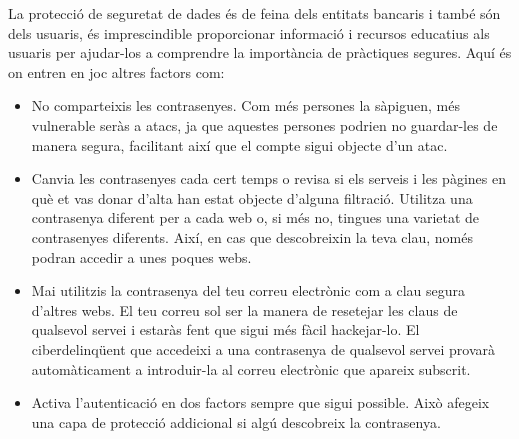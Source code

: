 La protecció de seguretat de dades és de feina dels entitats bancaris i també són dels usuaris, és imprescindible proporcionar informació i recursos educatius als usuaris per ajudar-los a comprendre la importància de pràctiques segures. Aquí és on entren en joc altres factors com:
\begin{itemize}
    \item No comparteixis les contrasenyes. Com més persones la sàpiguen, més vulnerable seràs a atacs, ja que aquestes persones podrien no guardar-les de manera segura, facilitant així que el compte sigui objecte d'un atac.
    \item Canvia les contrasenyes cada cert temps o revisa si els serveis i les pàgines en què et vas donar d'alta han estat objecte d'alguna filtració.
    Utilitza una contrasenya diferent per a cada web o, si més no, tingues una varietat de contrasenyes diferents. Així, en cas que descobreixin la teva clau, només podran accedir a unes poques webs.
    \item Mai utilitzis la contrasenya del teu correu electrònic com a clau segura d'altres webs. El teu correu sol ser la manera de resetejar les claus de qualsevol servei i estaràs fent que sigui més fàcil hackejar-lo. El ciberdelinqüent que accedeixi a una contrasenya de qualsevol servei provarà automàticament a introduir-la al correu electrònic que apareix subscrit.
    \item Activa l'autenticació en dos factors sempre que sigui possible. Això afegeix una capa de protecció addicional si algú descobreix la contrasenya.
\end{itemize}